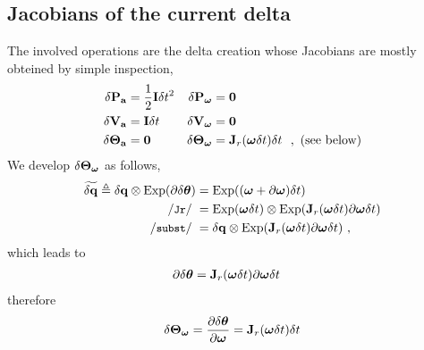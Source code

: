 \subsection{Jacobians of the current delta}%
\label{sec:jac_data}

%
%
%
The involved operations are the delta creation  whose Jacobians are mostly obteined by simple inspection,
%
\begin{align*}
{\delta{\bf P}}_{\bf a} &= \frac12{\bf I}\delta t^2 	& {\delta{\bf P}}_{{\bm \omega}} &= \bf0 \\
{\delta{\bf V}}_{\bf a} &= {\bf I}\delta t 			& {\delta{\bf V}}_{{\bm \omega}} &= \bf0 \\
{\delta{\bm \Theta}}_{\bf a} &= \bf0 				& {\delta{\bm \Theta}}_{{\bm \omega}} &= {\bf J}_r({{\bm \omega}}\delta t)\delta t ~~,\textrm{ (see below)} 
\end{align*}
%
We develop ${\delta{\bm \Theta}}_{{\bm \omega}}$ as follows,
%
\begin{align*}
\widetilde\dq \te \dq\ot\Exp(\partial\dth) 
&= \Exp((\bw+\partial\bw)\dt) \\
\cJr &= \Exp(\bw\dt)\ot\Exp(\bfJ_r(\bw\dt)\partial\bw\dt) \\
\csubst &= \dq \ot \Exp(\bfJ_r(\bw\dt)\partial\bw\dt)
~,
\end{align*}
%
which leads to
%
\begin{align*}
\partial{\delta{{\bm \theta}}} &= {\bf J}_r({{\bm \omega}}\delta t)\partial{{\bm \omega}}\delta t
\end{align*}
%
therefore
%
\begin{align}
{\delta{\bm \Theta}}_{{\bm \omega}} = \frac{\partial{\delta{{\bm \theta}}}}{\partial{{\bm \omega}}} = {\bf J}_r({{\bm \omega}}\delta t)\delta t
\end{align}

